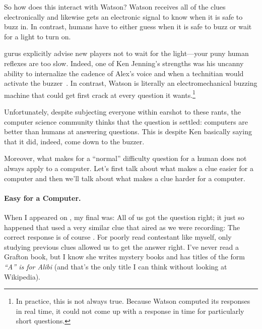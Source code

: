 So how does this interact with Watson?
%
Watson receives all of the clues electronically and likewise gets an electronic signal to know when it is safe to buzz in.
%
In contrast, humans have to either guess when it is safe to buzz or
wait for a light to turn on.


\jeopardy{} gurus explicitly advise new players not to wait for the light---your puny human reflexes are too slow.
%
Indeed, one of Ken Jenning's strengths was his uncanny ability to
internalize the cadence of Alex's voice and when a technitian would
activate the buzzer~\citep{jennings-06}.
%
In contrast, Watson is literally an electromechanical buzzing machine
that could get first crack at every question it wants.\footnote{In
practice, this is not always true.  Because Watson computed its
responses in real time, it could not come up with a response in time
for particularly short questions.}

Unfortunately, despite subjecting everyone within earshot to these
rants, the computer science community thinks that the question is
settled: computers are better than humans at answering questions.
%
This is despite Ken basically saying that it did, indeed, come down to
the buzzer.

Moreover, what makes for a ``normal'' difficulty question for a human
does not always apply to a computer.
%
Let's first talk about what makes a clue easier for a computer and
then we'll talk about what makes a clue harder for a computer.

\paragraph{Easy for a Computer.}

When I appeared on \jeopardyp{}, my final \jeopardy{} was:
%
All of us got the question right; it just so happened that \jeopardy{}
used a very similar clue that aired as we were recording:
%
%
The correct response is of course .
%
For poorly read contestant like myself, only studying previous clues
allowed us to get the answer right.
%
I've never read a Grafton book, but I know she writes mystery books and
has titles of the form \textit{``A'' is for Alibi} (and that's the
only title I can think without looking at Wikipedia).

